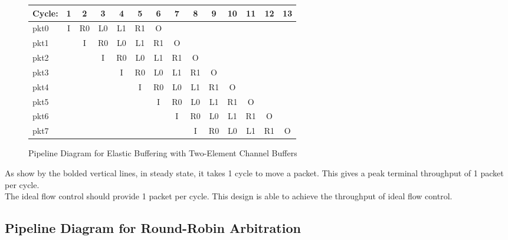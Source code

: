 \documentclass[10pt]{article}
\begin{document}
\begin{figure}[H]
\centering
{\setlength{\tabcolsep}{2pt}
\begin{tabular}{|l|c|c|c|c|c|c|c|c|c!{\vrule width 1.5pt}c!{\vrule width 1.5pt}c!{\vrule width 1.5pt}c!{\vrule width 1.5pt}c|}
\hline
Cycle: & 1  & 2  & 3  & 4  & 5  & 6  & 7  & 8  & 9  & 10 & 11 & 12 & 13 \\ \hline
pkt0   & I  & R0 & L0 & L1 & R1 & O  &    &    &    &    &    &    &    \\ \hline
pkt1   &    & I  & R0 & L0 & L1 & R1 & O  &    &    &    &    &    &    \\ \hline
pkt2   &    &    & I  & R0 & L0 & L1 & R1 & O  &    &    &    &    &    \\ \hline
pkt3   &    &    &    & I  & R0 & L0 & L1 & R1 & O  &    &    &    &    \\ \hline
pkt4   &    &    &    &    & I  & R0 & L0 & L1 & R1 & O  &    &    &    \\ \hline
pkt5   &    &    &    &    &    & I  & R0 & L0 & L1 & R1 & O  &    &    \\ \hline
pkt6   &    &    &    &    &    &    & I  & R0 & L0 & L1 & R1 & O  &    \\ \hline
pkt7   &    &    &    &    &    &    &    & I  & R0 & L0 & L1 & R1 & O  \\ \hline
\end{tabular}
}
\caption{Pipeline Diagram for Elastic Buffering with Two-Element Channel Buffers}
\end{figure}
As show by the bolded vertical lines, in steady state, it takes 1 cycle to move a packet. This gives a peak terminal throughput of 1 packet per cycle.\\
The ideal flow control should provide 1 packet per cycle. This design is able to achieve the throughput of ideal flow control.

\subsection{Pipeline Diagram for Round-Robin Arbitration}
\end{document}
